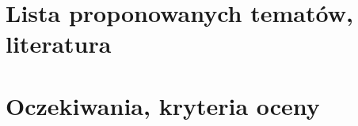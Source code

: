 \documentclass{beamer}
\begin{document}



\section{Lista proponowanych tematów, literatura}

\section{Oczekiwania, kryteria oceny}







\end{document}
